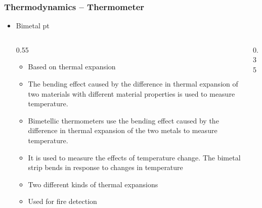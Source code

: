 \documentclass[t,aspectratio=169]{beamer}
\begin{document}

\begin{frame}
\frametitle{Thermodynamics -- Thermometer}
\begin{itemize}
\item Bimetal
 pt  
\begin{columns}
\begin{column}{0.55\textwidth}
\begin{itemize}
    \item Based on thermal expansion
    \item The bending effect caused by the difference in thermal expansion of two materials with different material properties is used to measure temperature.
    \item Bimetellic thermometers use the bending effect caused by the difference in thermal expansion of the two metals to measure temperature.
    \item It is used to measure the effects of temperature change. The bimetal strip bends in response to changes in temperature
    \item Two different kinds of thermal expansions   
    \item Used for fire detection
\end{itemize}
\end{column}
\begin{column}{0.35\textwidth}
\vfill
\begin{center}
\end{center}
\end{column}
\end{columns}
\end{itemize}
\end{frame}
\end{document}
